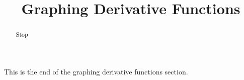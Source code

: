 \documentclass[handout]{ximera}
\title{Graphing Derivative Functions}
\begin{document}
\begin{abstract} Stop
\end{abstract}

\maketitle

This is the end of the graphing derivative functions section.
\end{document}
